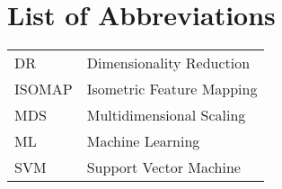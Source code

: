 \chapter*{List of Abbreviations}

\begin{table}[htbp]
	\begin{tabularx}{\textwidth}{XX}
		DR & Dimensionality Reduction \bigstrut\\
		ISOMAP & Isometric Feature Mapping \bigstrut\\
		MDS & Multidimensional Scaling \bigstrut\\
		ML & Machine Learning \bigstrut\\
		SVM & Support Vector Machine \bigstrut\\
	\end{tabularx}
\end{table}
